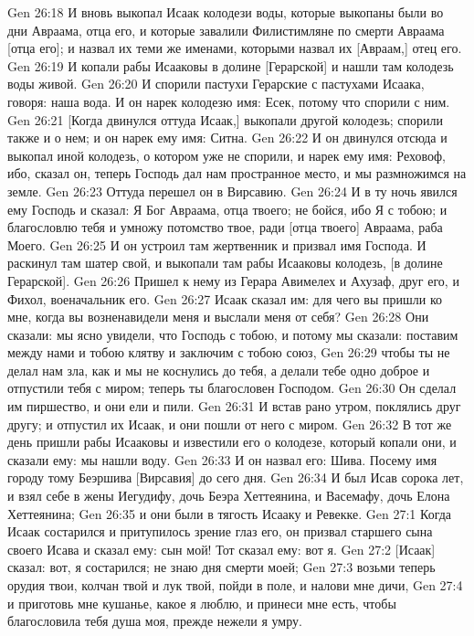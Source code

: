 \vs Gen 26:18 И вновь выкопал Исаак колодези воды, которые выкопаны были во дни Авраама, отца его, и которые завалили Филистимляне по смерти Авраама [отца его]; и назвал их теми же именами, которыми назвал их [Авраам,] отец его.
\vs Gen 26:19 И копали рабы Исааковы в долине [Герарской] и нашли там колодезь воды живой.
\vs Gen 26:20 И спорили пастухи Герарские с пастухами Исаака, говоря: наша вода. И он нарек колодезю имя: Есек, потому что спорили с ним.
\vs Gen 26:21 [Когда двинулся оттуда Исаак,] выкопали другой колодезь; спорили также и о нем; и он нарек ему имя: Ситна.
\vs Gen 26:22 И он двинулся отсюда и выкопал иной колодезь, о котором уже не спорили, и нарек ему имя: Реховоф, ибо, сказал он, теперь Господь дал нам пространное место, и мы размножимся на земле.
\rsbpar\vs Gen 26:23 Оттуда перешел он в Вирсавию.
\vs Gen 26:24 И в ту ночь явился ему Господь и сказал: Я Бог Авраама, отца твоего; не бойся, ибо Я с тобою; и благословлю тебя и умножу потомство твое, ради [отца твоего] Авраама, раба Моего.
\vs Gen 26:25 И он устроил там жертвенник и призвал имя Господа. И раскинул там шатер свой, и выкопали там рабы Исааковы колодезь, [в долине Герарской].
\vs Gen 26:26 Пришел к нему из Герара Авимелех и Ахузаф, друг его, и Фихол, военачальник его.
\vs Gen 26:27 Исаак сказал им: для чего вы пришли ко мне, когда вы возненавидели меня и выслали меня от себя?
\vs Gen 26:28 Они сказали: мы ясно увидели, что Господь с тобою, и потому мы сказали: поставим между нами и тобою клятву и заключим с тобою союз,
\vs Gen 26:29 чтобы ты не делал нам зла, как и мы не коснулись до тебя, а делали тебе одно доброе и отпустили тебя с миром; теперь ты благословен Господом.
\vs Gen 26:30 Он сделал им пиршество, и они ели и пили.
\vs Gen 26:31 И встав рано утром, поклялись друг другу; и отпустил их Исаак, и они пошли от него с миром.
\vs Gen 26:32 В тот же день пришли рабы Исааковы и известили его о колодезе, который копали они, и сказали ему: мы нашли воду.
\vs Gen 26:33 И он назвал его: Шива. Посему имя городу тому Беэршива [Вирсавия] до сего дня.
\vs Gen 26:34 И был Исав сорока лет, и взял себе в жены Иегудифу, дочь Беэра Хеттеянина, и Васемафу, дочь Елона Хеттеянина;
\vs Gen 26:35 и они были в тягость Исааку и Ревекке.
\vs Gen 27:1 Когда Исаак состарился и притупилось зрение глаз его, он призвал старшего сына своего Исава и сказал ему: сын мой! Тот сказал ему: вот я.
\vs Gen 27:2 [Исаак] сказал: вот, я состарился; не знаю дня смерти моей;
\vs Gen 27:3 возьми теперь орудия твои, колчан твой и лук твой, пойди в поле, и налови мне дичи,
\vs Gen 27:4 и приготовь мне кушанье, какое я люблю, и принеси мне есть, чтобы благословила тебя душа моя, прежде нежели я умру.
